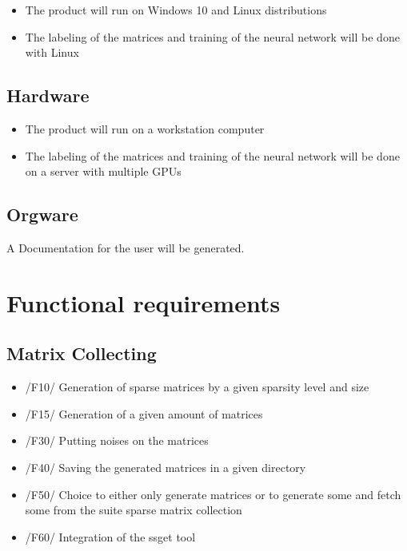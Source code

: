 \documentclass[parskip=full]{scrartcl}
\begin{document}
\begin{itemize}
\item The product will run on \gls{Windows} 10 and \gls{Linux} distributions 
\item The labeling of the matrices and training of the \gls{neural network} will be done with \gls{Linux}
\end{itemize}

\subsection{Hardware}

\begin{itemize}
\item The product will run on a workstation computer
\item The labeling of the matrices and training of the \gls{neural network} will be done on a server with multiple \glspl{GPU}
\end{itemize}

\subsection{Orgware}
A Documentation for the user will be generated.


\section{Functional requirements}
\subsection{Matrix Collecting}
	\begin{itemize}
	\item /F10/ Generation of sparse matrices by a given sparsity level and size
	\item /F15/ Generation of a given amount of matrices
	\item /F30/ Putting \glspl{noise} on the matrices
 	\item /F40/ Saving the generated matrices in a given directory
        \item /F50/ Choice to either only generate matrices or to generate some and fetch some from the suite sparse matrix collection
	\item /F60/ Integration of the \gls{ssget} tool
	\end{itemize}
\end{document}
